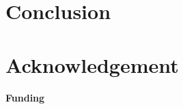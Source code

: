 \documentclass{bioinfo}
\begin{document}
\section{Conclusion}


\section*{Acknowledgement}

\paragraph{Funding\textcolon} %

%
%
%
%
%
%
%
%
%


\begin{thebibliography}{}







\end{thebibliography}
\end{document}
